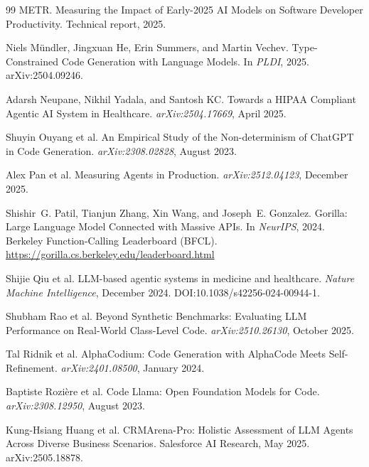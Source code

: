 \documentclass[11pt]{article}
\begin{document}
\begin{thebibliography}{99}
METR.
\newblock Measuring the Impact of Early-2025 AI Models on Software Developer Productivity.
\newblock Technical report, 2025.

Niels M\"{u}ndler, Jingxuan He, Erin Summers, and Martin Vechev.
\newblock Type-Constrained Code Generation with Language Models.
\newblock In \emph{PLDI}, 2025.
\newblock arXiv:2504.09246.

Adarsh Neupane, Nikhil Yadala, and Santosh KC.
\newblock Towards a HIPAA Compliant Agentic AI System in Healthcare.
\newblock \emph{arXiv:2504.17669}, April 2025.

Shuyin Ouyang et al.
\newblock An Empirical Study of the Non-determinism of ChatGPT in Code Generation.
\newblock \emph{arXiv:2308.02828}, August 2023.

Alex Pan et al.
\newblock Measuring Agents in Production.
\newblock \emph{arXiv:2512.04123}, December 2025.

Shishir~G. Patil, Tianjun Zhang, Xin Wang, and Joseph~E. Gonzalez.
\newblock Gorilla: Large Language Model Connected with Massive APIs.
\newblock In \emph{NeurIPS}, 2024.
\newblock Berkeley Function-Calling Leaderboard (BFCL).
\newblock \url{https://gorilla.cs.berkeley.edu/leaderboard.html}

Shijie Qiu et al.
\newblock LLM-based agentic systems in medicine and healthcare.
\newblock \emph{Nature Machine Intelligence}, December 2024.
\newblock DOI:10.1038/s42256-024-00944-1.

Shubham Rao et al.
\newblock Beyond Synthetic Benchmarks: Evaluating LLM Performance on Real-World Class-Level Code.
\newblock \emph{arXiv:2510.26130}, October 2025.

Tal Ridnik et al.
\newblock AlphaCodium: Code Generation with AlphaCode Meets Self-Refinement.
\newblock \emph{arXiv:2401.08500}, January 2024.

Baptiste Rozi\`{e}re et al.
\newblock Code Llama: Open Foundation Models for Code.
\newblock \emph{arXiv:2308.12950}, August 2023.

Kung-Hsiang Huang et al.
\newblock CRMArena-Pro: Holistic Assessment of LLM Agents Across Diverse Business Scenarios.
\newblock Salesforce AI Research, May 2025.
\newblock arXiv:2505.18878.


\end{thebibliography}
\end{document}
